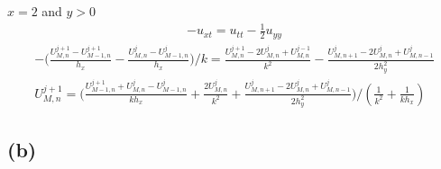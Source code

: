 \documentclass[en,hazy,screen,blue,normal]{elegantnote}
\begin{document}
$x = 2$ and $y>0$
\begin{align*}
    - u_{xt} = u_{tt} - \frac{1}{2} u_{yy}
\end{align*}
\begin{align*}
    - \biggl(\frac{U_{M, n}^{j+1} - U_{M-1, n}^{j+1}}{h_x} - \frac{U_{M, n}^{j} - U_{M-1, n}^{j}}{h_x}\biggr)/k
    = \frac{U_{M, n}^{j+1} -2U_{M, n}^j + U_{M, n}^{j-1}}{k^2} -\frac{U_{M, n+1}^j - 2U_{M, n}^j + U_{M, n-1}^j}{2h_y^2} \\
    U_{M, n}^{j+1} = \biggl(\frac{U_{M-1, n}^{j+1} +U_{M, n}^j -U_{M-1, n}^j}{k h_x} + \frac{2U_{M, n}^j}{k^2} + \frac{U_{M, n+1}^j - 2U_{M, n}^j + U_{M, n-1}^j}{2h_y^2}\biggr)/(\frac{1}{k^2} + \frac{1}{k h_x})
\end{align*}



\subsection{(b)}
\end{document}
